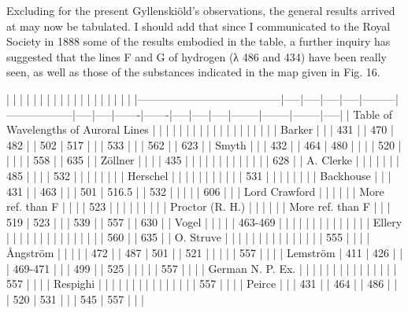 \documentclass[a4paper, 12pt, oneside, polutonikogreek, english]{article}
\begin{document}
Excluding for the present Gyllenskiöld's observations, the general results arrived at may now be tabulated. I should add that since I communicated to the Royal Society in 1888 some of the results embodied in the table, a further inquiry has suggested that the lines F and G of hydrogen (λ 486 and 434) have been really seen, as well as those of the substances indicated in the map given in Fig. 16.

|                    |   |   |   |   |     |         |   |   |    |    |   |   |   |    |    |    |   |
|---------------------------------------|-----|-----|-----|-----|---------|------------------|-----|-----|-------|-------|-----|-----|-----|--------|--------|--------|-----|
| Table of Wavelengths of Auroral Lines |   |   |   |   |     |         |   |   |    |    |   |   |   |    |    |    |   |
| Barker                |   |   | 431 |   | 470   | 482       |   | 502 | 517  |    |   | 533 |   |    | 562  |    | 623 |
| Smyth                 |   |   | 432 |   | 464   | 480       |   |   |    | 520  |   |   |   |    | 558  |    | 635 |
| Zöllner                |   |   |   | 435 |     |         |   |   |    |    |   |   |   |    |    |    | 628 |
| A. Clerke               |   |   |   |   |     |         | 485 |   |    |    | 532 |   |   |    |    |    |   |
| Herschel               |   |   |   |   |     |         |   |   |    |    | 531 |   |   |    |    |    |   |
| Backhouse               |   |   | 431 |   | 463   |         |   | 501 | 516.5 |    | 532 |   |   |    |    | 606  |   |
| Lord Crawford             |   |   |   |   |     | More ref. than F |   |   |    | 523  |   |   |   |    |    |    |   |
| Proctor (R. H.)            |   |   |   |   |     | More ref. than F |   |   | 519  | 523  |   |   | 539 |    | 557  |    | 630 |
| Vogel                 |   |   |   |   | 463-469 |         |   |   |    |    |   |   |   |    |    |    |   |
| Ellery                |   |   |   |   |     |         |   |   |    |    |   |   |   |    | 560  |    | 635 |
| O. Struve               |   |   |   |   |     |         |   |   |    |    |   |   |   |    | 555  |    |   |
| Ångström               |   |   |   |   | 472   |         | 487 | 501 |    | 521  |   |   |   |    | 557  |    |   |
| Lemström               | 411 | 426 |   |   | 469-471 |         |   | 499 |    | 525  |   |   |   |    | 557  |    |   |
| German N. P. Ex.           |   |   |   |   |     |         |   |   |    |    |   |   |   |    | 557  |    |   |
| Respighi               |   |   |   |   |     |         |   |   |    |    |   |   |   |    | 557  |    |   |
| Peirce                |   |   | 431 |   | 464   |         | 486 |   |    | 520  | 531 |   |   | 545  | 557  |    |   |
\end{document}
